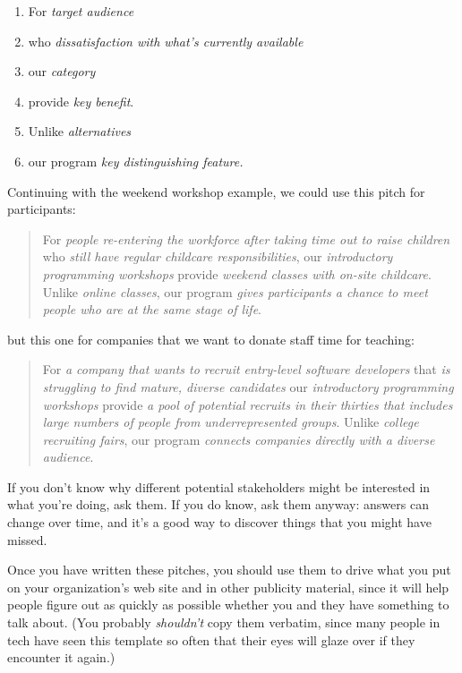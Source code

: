 \begin{enumerate}
\item
  For \emph{target audience}
\item
  who \emph{dissatisfaction with what's currently available}
\item
  our \emph{category}
\item
  provide \emph{key benefit}.
\item
  Unlike \emph{alternatives}
\item
  our program \emph{key distinguishing feature.}
\end{enumerate}

Continuing with the weekend workshop example, we could use this pitch
for participants:

\begin{quote}\setlength{\parindent}{0pt}
For \emph{people re-entering the workforce after taking time out to raise
children} who \emph{still have regular childcare responsibilities}, our
\emph{introductory programming workshops} provide \emph{weekend classes with
on-site childcare}. Unlike \emph{online classes}, our program \emph{gives
participants a chance to meet people who are at the same stage of
life}.
\end{quote}

but this one for companies that we want to donate staff time for
teaching:

\begin{quote}\setlength{\parindent}{0pt}
For \emph{a company that wants to recruit entry-level software developers}
that \emph{is struggling to find mature, diverse candidates} our
\emph{introductory programming workshops} provide \emph{a pool of potential
recruits in their thirties that includes large numbers of people from
underrepresented groups}. Unlike \emph{college recruiting fairs}, our
program \emph{connects companies directly with a diverse audience}.
\end{quote}

If you don't know why different potential stakeholders might be
interested in what you're doing, ask them. If you do know, ask them
anyway: answers can change over time, and it's a good way to discover
things that you might have missed.

Once you have written these pitches, you should use them to drive what
you put on your organization's web site and in other publicity material,
since it will help people figure out as quickly as possible whether you
and they have something to talk about. (You probably \emph{shouldn't} copy
them verbatim, since many people in tech have seen this template so
often that their eyes will glaze over if they encounter it again.)

